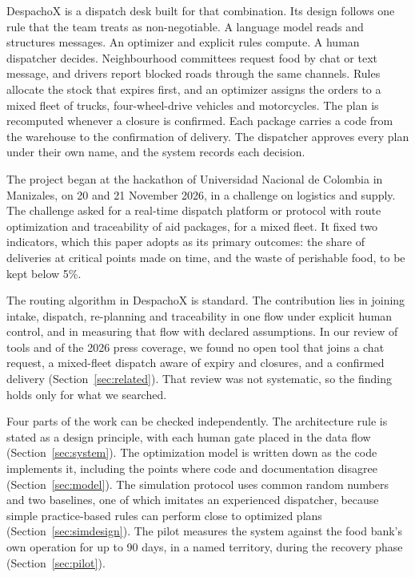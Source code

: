 \documentclass[11pt]{article}
\begin{document}
DespachoX is a dispatch desk built for that combination. Its design follows one rule that the team treats as non-negotiable. A language model reads and structures messages. An optimizer and explicit rules compute. A human dispatcher decides. Neighbourhood committees request food by chat or text message, and drivers report blocked roads through the same channels. Rules allocate the stock that expires first, and an optimizer assigns the orders to a mixed fleet of trucks, four-wheel-drive vehicles and motorcycles. The plan is recomputed whenever a closure is confirmed. Each package carries a code from the warehouse to the confirmation of delivery. The dispatcher approves every plan under their own name, and the system records each decision.

The project began at the hackathon of Universidad Nacional de Colombia in Manizales, on 20 and 21 November 2026, in a challenge on logistics and supply. The challenge asked for a real-time dispatch platform or protocol with route optimization and traceability of aid packages, for a mixed fleet. It fixed two indicators, which this paper adopts as its primary outcomes: the share of deliveries at critical points made on time, and the waste of perishable food, to be kept below 5\%. %

The routing algorithm in DespachoX is standard. The contribution lies in joining intake, dispatch, re-planning and traceability in one flow under explicit human control, and in measuring that flow with declared assumptions. In our review of tools and of the 2026 press coverage, we found no open tool that joins a chat request, a mixed-fleet dispatch aware of expiry and closures, and a confirmed delivery (Section~\ref{sec:related}). That review was not systematic, so the finding holds only for what we searched.

Four parts of the work can be checked independently. The architecture rule is stated as a design principle, with each human gate placed in the data flow (Section~\ref{sec:system}). The optimization model is written down as the code implements it, including the points where code and documentation disagree (Section~\ref{sec:model}). The simulation protocol uses common random numbers and two baselines, one of which imitates an experienced dispatcher, because simple practice-based rules can perform close to optimized plans \citep{cook2017dispatching,gralla2018humanitarian} (Section~\ref{sec:simdesign}). The pilot measures the system against the food bank's own operation for up to 90 days, in a named territory, during the recovery phase (Section~\ref{sec:pilot}).
\end{document}
